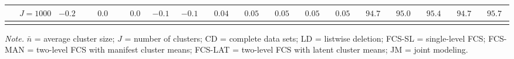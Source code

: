 \begin{sidewaystable}
\begin{threeparttable}
\begin{tabular}{llccccccccccccccc}
 & \nopagebreak $\;J=1000$  & ${-}0.2\phantom{0}$ & $\phantom{-}0.0\phantom{0}$ & $\phantom{-}0.0\phantom{0}$ & ${-}0.1\phantom{0}$ & ${-}0.1\phantom{0}$ & $\phantom{0}0.04\phantom{0}$ & $\phantom{0}0.05\phantom{0}$ & $\phantom{0}0.05\phantom{0}$ & $\phantom{0}0.05\phantom{0}$ & $\phantom{0}0.05\phantom{0}$ & $\phantom{0}94.7\phantom{0}$ & $\phantom{0}95.0\phantom{0}$ & $\phantom{0}95.4\phantom{0}$ & $\phantom{0}94.7\phantom{0}$ & $\phantom{0}95.7\phantom{0}$ \\
[0.5ex]\hline\\[-1.6ex] 
\end{tabular}
\begin{tablenotes}{\footnotesize \textit{Note.} $\bar{n}$ = average cluster size; $J$ = number of clusters; CD = complete data sets; LD = listwise deletion; FCS-SL = single-level FCS; FCS-MAN = two-level FCS with manifest cluster means; FCS-LAT = two-level FCS with latent cluster means; JM = joint modeling.}\end{tablenotes}
\end{threeparttable}
\end{sidewaystable}
